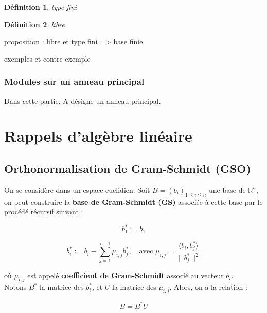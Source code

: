 \documentclass[a4paper,12pt]{report}  %
\theoremstyle{definitionstyle}
\newtheorem{definition}{Définition}[chapter] %
\theoremstyle{examplestyle}
\theoremstyle{remarkstyle}
\theoremstyle{propositionstyle}
\begin{document}
	
	\begin{definition}
		type fini
	\end{definition}

	\begin{definition}
		libre
	\end{definition}


	proposition : libre et type fini => base finie
	
	exemples et contre-exemple
	
	
	
	\subsection{Modules sur un anneau principal}
	Dans cette partie, A désigne un anneau principal.
	
	\chapter{Rappels d'algèbre linéaire}
	
	
	\section{Orthonormalisation de Gram-Schmidt (GSO)}
	
	On se considère dans un espace euclidien. Soit \( B = (b_i)_{1 \leq i \leq n} \) une base de \( \mathbb{R}^n \), on peut construire la \textbf{base de Gram-Schmidt (GS)} associée à cette base par le procédé récursif suivant :
	
	
	$$b_1^* := b_1$$
	
	
	$$b_i^* := b_i - \sum_{j=1}^{i-1} \mu_{i,j} b_j^*, \quad \text{avec } \mu_{i,j} = \frac{\langle b_i, b_j^* \rangle}{\| b_j^* \|^2}$$
	
	où \( \mu_{i,j} \) est appelé \textbf{coefficient de Gram-Schmidt} associé au vecteur \( b_i \). \\
	
	Notons \( B^* \) la matrice des \( b_i^* \), et \( U \) la matrice des \( \mu_{i,j} \). Alors, on a la relation :
	
	$$B = B^* U$$
	
\end{document}
